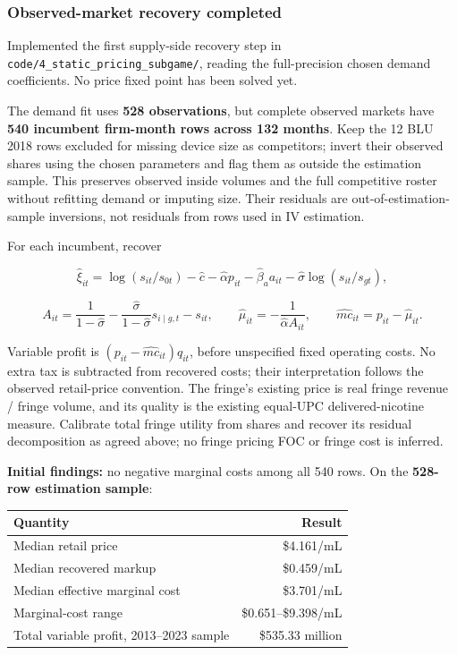 \documentclass[10pt,]{article}
\begin{document}
\subsubsection{Observed-market recovery
completed}\label{observed-market-recovery-completed}

Implemented the first supply-side recovery step in
\texttt{code/4\_static\_pricing\_subgame/}, reading the full-precision
chosen demand coefficients. No price fixed point has been solved yet.

The demand fit uses \textbf{528 observations}, but complete observed
markets have \textbf{540 incumbent firm-month rows across 132 months}.
Keep the 12 BLU 2018 rows excluded for missing device size as
competitors; invert their observed shares using the chosen parameters
and flag them as outside the estimation sample. This preserves observed
inside volumes and the full competitive roster without refitting demand
or imputing size. Their residuals are out-of-estimation-sample
inversions, not residuals from rows used in IV estimation.

For each incumbent, recover

\[
\widehat\xi_{it}=\log(s_{it}/s_{0t})-\widehat c-\widehat\alpha  p_{it}
-\widehat\beta_a a_{it}-\widehat\sigma\log(s_{it}/s_{gt}),
\]

\[
A_{it}=\frac{1}{1-\widehat\sigma}-\frac{\widehat\sigma}{1-\widehat\sigma}s_{i\mid g,t}-s_{it},\qquad
\widehat\mu_{it}=-\frac{1}{\widehat\alpha  A_{it}},\qquad
\widehat{mc}_{it}=p_{it}-\widehat\mu_{it}.
\]

Variable profit is \((p_{it}-\widehat{mc}_{it})q_{it}\), before
unspecified fixed operating costs. No extra tax is subtracted from
recovered costs; their interpretation follows the observed retail-price
convention. The fringe's existing price is real fringe revenue / fringe
volume, and its quality is the existing equal-UPC delivered-nicotine
measure. Calibrate total fringe utility from shares and recover its
residual decomposition as agreed above; no fringe pricing FOC or fringe
cost is inferred.

\textbf{Initial findings:} no negative marginal costs among all 540
rows. On the \textbf{528-row estimation sample}:

\begin{longtable}[]{@{}lr@{}}
\toprule
Quantity & Result\tabularnewline
\midrule
\endhead
Median retail price & \$4.161/mL\tabularnewline
Median recovered markup & \$0.459/mL\tabularnewline
Median effective marginal cost & \$3.701/mL\tabularnewline
Marginal-cost range & \$0.651--\$9.398/mL\tabularnewline
Total variable profit, 2013--2023 sample & \$535.33
million\tabularnewline
\bottomrule
\end{longtable}
\end{document}
